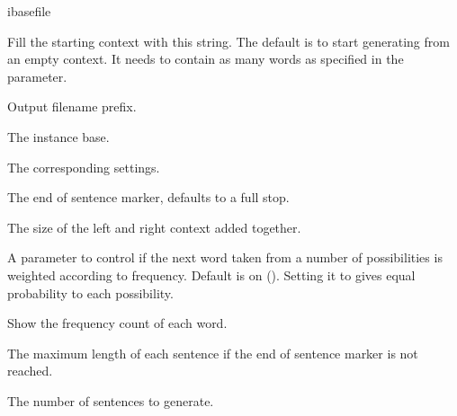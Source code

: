\documentclass[a4paper,10pt,twoside]{report}
\begin{document}
\begin{varlist}{ibasefile}
\item[start] Fill the starting context with this string. The default
  is to start generating from an empty context. It needs to contain as
  many words as specified in the  parameter.
\item[filename] Output filename prefix.
\item[ibasefile] The instance base.
\item[timbl] The corresponding \Timbl{} settings.
\item[end] The end of sentence marker, defaults to a full stop.
\item[ws] The size of the left and right context added together.
\item[mode] A parameter to control if the next word taken from a
  number of possibilities is weighted according to frequency. Default
  is on (). Setting it to  gives equal probability to
  each possibility.
\item[sc] Show the frequency count of each word.
\item[len] The maximum length of each sentence if the end of sentence
  marker is not reached.
\item[n] The number of sentences to generate.
\end{varlist}

\subsection{}
\end{document}
